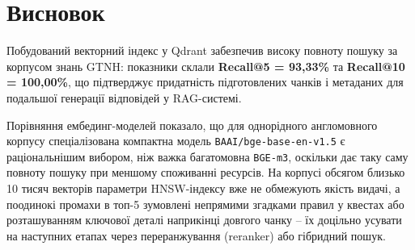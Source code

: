 \clearpage
{}
\chapter*{Висновок}
\label{chapter:conclusion}

Побудований векторний індекс у Qdrant забезпечив високу повноту пошуку за корпусом знань GTNH: показники склали \textbf{Recall@5 = 93,33\%} та \textbf{Recall@10 = 100,00\%}, що підтверджує придатність підготовлених чанків і метаданих для подальшої генерації відповідей у RAG-системі.

Порівняння ембединг-моделей показало, що для однорідного англомовного корпусу спеціалізована компактна модель \texttt{BAAI/bge-base-en-v1.5} є раціональнішим вибором, ніж важка багатомовна \texttt{BGE-m3}, оскільки дає таку саму повноту пошуку при меншому споживанні ресурсів. На корпусі обсягом близько 10 тисяч векторів параметри HNSW-індексу вже не обмежують якість видачі, а поодинокі промахи в топ-5 зумовлені непрямими згадками правил у квестах або розташуванням ключової деталі наприкінці довгого чанку -- їх доцільно усувати на наступних етапах через переранжування (reranker) або гібридний пошук.